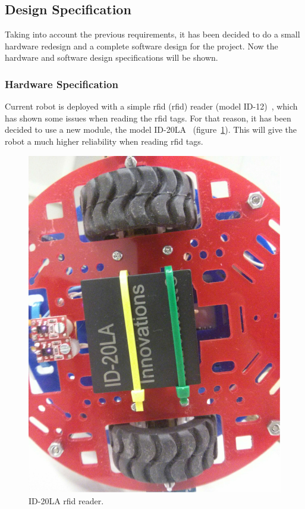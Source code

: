 \subsection{Design Specification}

Taking into account the previous requirements, it has been decided to do a small hardware redesign
and a complete software design for the project. Now the hardware and software design specifications
will be shown.

\subsubsection{Hardware Specification}

Current robot is deployed with a simple \acrshort{rfid} (\acrlong{rfid}) reader
(model ID-12)~\cite{rfid}, which has shown some issues when reading the \acrshort{rfid} tags. For
that reason, it has been decided to use a new module, the model ID-20LA~\cite{rfid}
(figure~\ref{fig:rfid}). This will give the robot a much higher reliability when reading
\acrshort{rfid} tags.

\begin{figure}[!htbp]
	\centering
	\includegraphics[width=0.3\textheight, angle=-90]{fig/rfid}
	\caption{ID-20LA \acrshort{rfid} reader.}
	\label{fig:rfid}
\end{figure}

